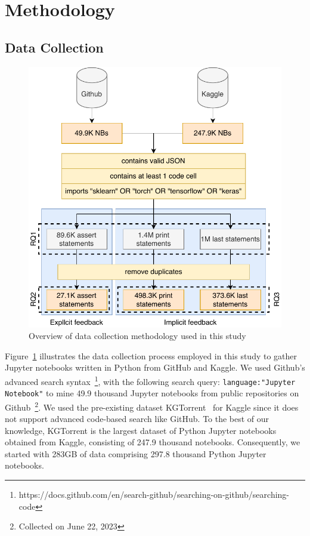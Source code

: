\section{Methodology}

\subsection{Data Collection}\label{sec:data-collect}

\begin{figure}
  \centering
  \includegraphics[width=0.75\linewidth]{data-collection.pdf}
  \caption{Overview of data collection methodology used in this study}
  \label{fig:data-collection}
\end{figure}


Figure~\ref{fig:data-collection} illustrates the data collection process employed in this study to gather Jupyter notebooks written in Python from GitHub and Kaggle. We used Github's advanced search syntax~\footnote{https://docs.github.com/en/search-github/searching-on-github/searching-code}, with the following search query: \lstinline[language={}]$language:"Jupyter Notebook"$ to mine 49.9 thousand Jupyter notebooks from public repositories on Github~\footnote{Collected on June 22, 2023}. We used the pre-existing dataset KGTorrent~\cite{quaranta2021kgtorrent} for Kaggle since it does not support advanced code-based search like GitHub. To the best of our knowledge, KGTorrent is the largest dataset of Python Jupyter notebooks obtained from Kaggle, consisting of 247.9 thousand notebooks. Consequently, we started with 283GB of data comprising 297.8 thousand Python Jupyter notebooks.

